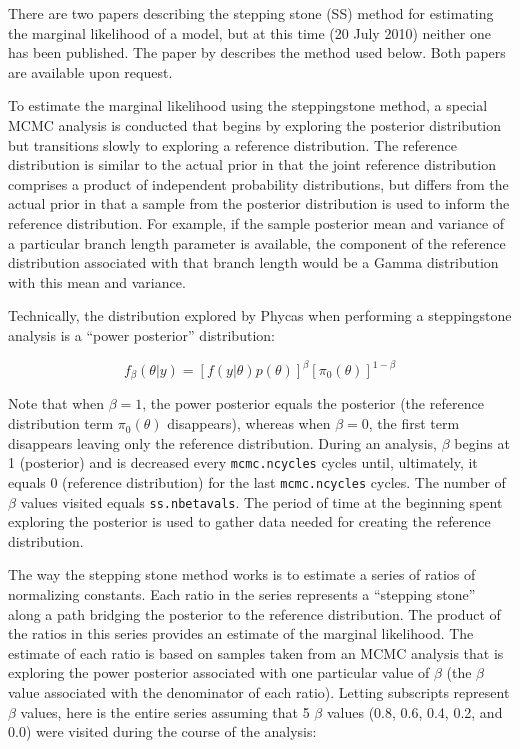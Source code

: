 \documentclass[10pt]{article}
\newcommand{\currReleaseDate}{20 July 2010}		%
\newcommand{\opt}[2]{{\tt \small #1.#2}\index{#1!#2}}	%
\begin{document}
There are two papers \citep{FanWuChenKuoLewis2010,XieLewisFanKuoChen2010} describing the stepping stone (SS) method for estimating the marginal likelihood of a model, but at this time (\currReleaseDate) neither one has been published. The paper by \citet{FanWuChenKuoLewis2010} describes the method used below. Both papers are available upon request.

To estimate the marginal likelihood using the steppingstone method, a special MCMC analysis is conducted that begins by exploring the posterior distribution but transitions slowly to exploring a reference distribution.  The reference distribution is similar to the actual prior in that the joint reference distribution comprises a product of independent probability distributions, but differs from the actual prior in that a sample from the posterior distribution is used to inform the reference distribution. For example, if the sample posterior mean and variance of a particular branch length parameter is available, the component of the reference distribution associated with that branch length would be a Gamma distribution with this mean and variance. 

Technically, the distribution explored by Phycas when performing a steppingstone analysis is a ``power posterior'' distribution:

\[f_{\beta}(\theta|y) = \left[ f(y|\theta) p(\theta) \right]^{\beta} \left[ \pi_0(\theta) \right]^{1 - \beta}\]

Note that when $\beta = 1$, the power posterior equals the posterior (the reference distribution term $\pi_0(\theta)$ disappears), whereas when $\beta = 0$, the first term disappears leaving only the reference distribution. During an analysis, $\beta$ begins at 1 (posterior) and is decreased every \opt{mcmc}{ncycles} cycles until, ultimately, it equals 0 (reference distribution) for the last \opt{mcmc}{ncycles} cycles. The number of $\beta$ values visited equals \opt{ss}{nbetavals}. The period of time at the beginning spent exploring the posterior is used to gather data needed for creating the reference distribution. 

The way the stepping stone method works is to estimate a series of ratios of normalizing constants. Each ratio in the series represents a ``stepping stone'' along a path bridging the posterior to the reference distribution. The product of the ratios in this series provides an estimate of the marginal likelihood. The estimate of each ratio is based on samples taken from an MCMC analysis that is exploring the power posterior associated with one particular value of $\beta$ (the $\beta$ value associated with the denominator of each ratio). Letting subscripts represent $\beta$ values, here is the entire series assuming that 5 $\beta$ values (0.8, 0.6, 0.4, 0.2, and 0.0) were visited during the course of the analysis:
\end{document}
